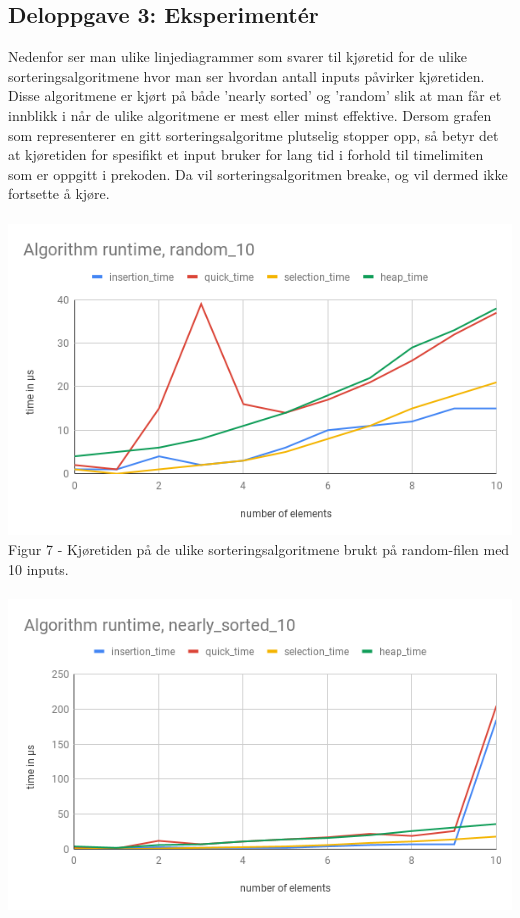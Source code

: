 \documentclass[a4paper, article, oneside, norsk]{memoir} %
\newcommand{\0}{\mathbf{0}}
\newcommand{\1}{\mathbf{1}}
\begin{document}
\subsection*{Deloppgave 3: Eksperimentér}
Nedenfor ser man ulike linjediagrammer som svarer til kjøretid for de ulike sorteringsalgoritmene hvor man ser hvordan antall inputs påvirker kjøretiden. Disse algoritmene er kjørt på både 'nearly sorted' og 'random' slik at man får et innblikk i når de ulike algoritmene er mest eller minst effektive. Dersom grafen som representerer en gitt sorteringsalgoritme plutselig stopper opp, så betyr det at kjøretiden for spesifikt et input bruker for lang tid i forhold til timelimiten som er oppgitt i prekoden. Da vil sorteringsalgoritmen breake, og vil dermed ikke fortsette å kjøre.
\\
\\
\includegraphics[scale=0.6]{Algorithm runtime, random_10.png}
\\
Figur 7 - Kjøretiden på de ulike sorteringsalgoritmene brukt på random-filen med 10 inputs.
\\
\\
\includegraphics[scale=0.65]{Algorithm runtime, nearly_sorted_10.png}
\end{document}
